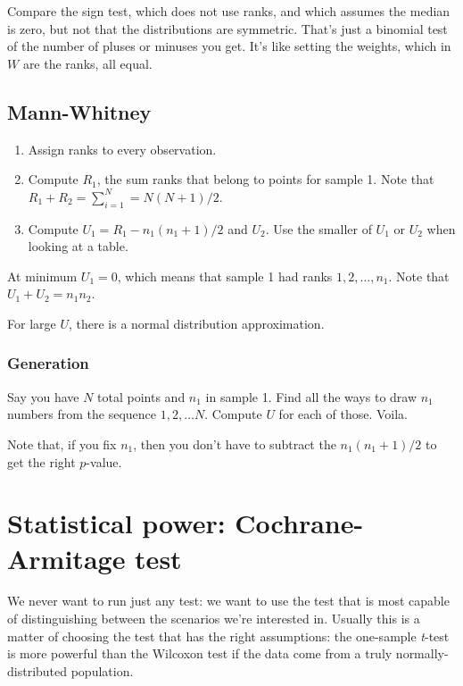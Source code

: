 \documentclass{book}
\providecommand{\tightlist}{%
  \setlength{\itemsep}{0pt}\setlength{\parskip}{0pt}}
\begin{document}
Compare the sign test, which does not use ranks, and which assumes the
median is zero, but not that the distributions are symmetric. That's
just a binomial test of the number of pluses or minuses you get. It's
like setting the weights, which in \(W\) are the ranks, all equal.

\subsection{Mann-Whitney}\label{mann-whitney}

\begin{enumerate}
\def\labelenumi{\arabic{enumi}.}
\tightlist
\item
  Assign ranks to every observation.
\item
  Compute \(R_1\), the sum ranks that belong to points for sample 1.
  Note that \(R_1 + R_2 = \sum_{i=1}^N = N(N+1)/2\).
\item
  Compute \(U_1 = R_1 - n_1(n_1+1)/2\) and \(U_2\). Use the smaller of
  \(U_1\) or \(U_2\) when looking at a table.
\end{enumerate}

At minimum \(U_1 = 0\), which means that sample 1 had ranks
\(1,2,\ldots,n_1\). Note that \(U_1 + U_2 = n_1 n_2\).

For large \(U\), there is a normal distribution approximation.

\subsubsection{Generation}\label{generation}

Say you have \(N\) total points and \(n_1\) in sample 1. Find all the
ways to draw \(n_1\) numbers from the sequence \(1, 2, \ldots N\).
Compute \(U\) for each of those. Voila.

Note that, if you fix \(n_1\), then you don't have to subtract the
\(n_1(n_1+1)/2\) to get the right \(p\)-value.

\section{Statistical power: Cochrane-Armitage
test}\label{statistical-power-cochrane-armitage-test}

We never want to run just any test: we want to use the test that is most
capable of distinguishing between the scenarios we're interested in.
Usually this is a matter of choosing the test that has the right
assumptions: the one-sample \emph{t}-test is more powerful than the
Wilcoxon test if the data come from a truly normally-distributed
population.
\end{document}
